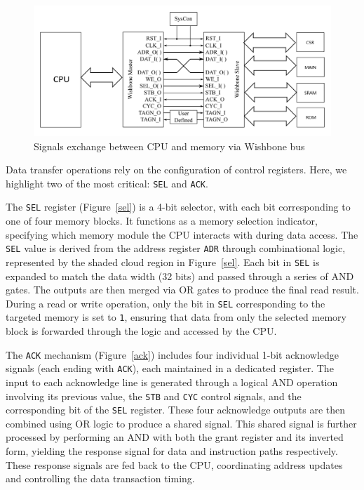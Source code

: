 \begin{figure}[t!]
  \centering
  \includegraphics[width=\linewidth]{Chapitre3/figures/Wishbone.png}
  \caption{Signals exchange between CPU and memory via Wishbone bus}
  \label{architecturebus}
\end{figure}

Data transfer operations rely on the configuration of control registers. Here, we highlight two of the most critical: \texttt{SEL} and \texttt{ACK}.

The \texttt{SEL} register (Figure~\ref{sel}) is a 4-bit selector, with each bit corresponding to one of four memory blocks. It functions as a memory selection indicator, specifying which memory module the CPU interacts with during data access. The \texttt{SEL} value is derived from the address register \texttt{ADR} through combinational logic, represented by the shaded cloud region in Figure~\ref{sel}. Each bit in \texttt{SEL} is expanded to match the data width (32 bits) and passed through a series of AND gates. The outputs are then merged via OR gates to produce the final read result. During a read or write operation, only the bit in \texttt{SEL} corresponding to the targeted memory is set to \texttt{1}, ensuring that data from only the selected memory block is forwarded through the logic and accessed by the CPU.

The \texttt{ACK} mechanism (Figure~\ref{ack}) includes four individual 1-bit acknowledge signals (each ending with \texttt{ACK}), each maintained in a dedicated register. The input to each acknowledge line is generated through a logical AND operation involving its previous value, the \texttt{STB} and \texttt{CYC} control signals, and the corresponding bit of the \texttt{SEL} register. These four acknowledge outputs are then combined using OR logic to produce a shared signal. This shared signal is further processed by performing an AND with both the grant register and its inverted form, yielding the response signal for data and instruction paths respectively. These response signals are fed back to the CPU, coordinating address updates and controlling the data transaction timing.

